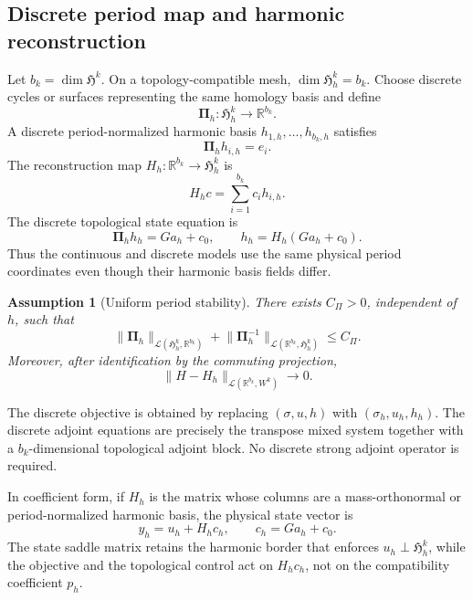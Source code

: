 \documentclass{article}
\newtheorem{assumption}{Assumption}[section]
\newcommand{\R} {\mathbb R}
\newcommand{\HH}{\mathfrak H}
\newcommand{\Piop}{\boldsymbol\Pi}
\newcommand{\norm}[1]{\lVert #1\rVert}
\begin{document}
\subsection{Discrete period map and harmonic reconstruction}
Let $b_k=\dim\HH^k$. On a topology-compatible mesh, $\dim\HH_h^k=b_k$. Choose discrete cycles or surfaces representing the same homology basis and define
\begin{equation}
 \Piop_h:\HH_h^k\to\R^{b_k}.
\end{equation}
A discrete period-normalized harmonic basis $h_{1,h},\dots,h_{b_k,h}$ satisfies
\[
 \Piop_hh_{i,h}=e_i.
\]
The reconstruction map $H_h:\R^{b_k}\to\HH_h^k$ is
\[
 H_hc=\sum_{i=1}^{b_k}c_i h_{i,h}.
\]
The discrete topological state equation is
\begin{equation}
 \Piop_hh_h=Ga_h+c_0,
 \qquad h_h=H_h(Ga_h+c_0).
\end{equation}
Thus the continuous and discrete models use the same physical period coordinates even though their harmonic basis fields differ.

\begin{assumption}[Uniform period stability]\label{ass:period}
There exists $C_\Pi>0$, independent of $h$, such that
\[
 \norm{\Piop_h}_{\mathcal L(\HH_h^k,\R^{b_k})}
 +\norm{\Piop_h^{-1}}_{\mathcal L(\R^{b_k},\HH_h^k)}\le C_\Pi.
\]
Moreover, after identification by the commuting projection,
\[
 \norm{H-H_h}_{\mathcal L(\R^{b_k},W^k)}\to0.
\]
\end{assumption}

The discrete objective is obtained by replacing $(\sigma,u,h)$ with $(\sigma_h,u_h,h_h)$. The discrete adjoint equations are precisely the transpose mixed system together with a $b_k$-dimensional topological adjoint block. No discrete strong adjoint operator is required.

In coefficient form, if $H_h$ is the matrix whose columns are a mass-orthonormal or period-normalized harmonic basis, the physical state vector is
\[
 y_h=u_h+H_hc_h,\qquad c_h=Ga_h+c_0.
\]
The state saddle matrix retains the harmonic border that enforces $u_h\perp\HH_h^k$, while the objective and the topological control act on $H_hc_h$, not on the compatibility coefficient $p_h$.
\end{document}
